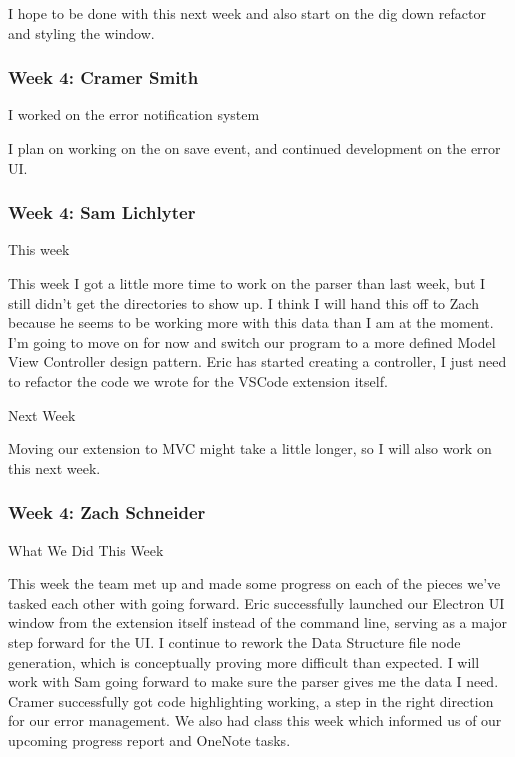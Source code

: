 I hope to be done with this next week and also start on the dig down refactor and styling the window. \\ 

 \subsubsection{Week 4: Cramer Smith}

I worked on the error notification system



I plan on working on the on save event, and continued development on the error UI. \\ 

 \subsubsection{Week 4: Sam Lichlyter}

This week

This week I got a little more time to work on the parser than last week, but I still didn't get the directories to show up. I think I will hand this off to Zach because he seems to be working more with this data than I am at the moment. I'm going to move on for now and switch our program to a more defined Model View Controller design pattern. Eric has started creating a controller, I just need to refactor the code we wrote for the VSCode extension itself. 



Next Week

Moving our extension to MVC might take a little longer, so I will also work on this next week.  \\ 

 \subsubsection{Week 4: Zach Schneider}

What We Did This Week

This week the team met up and made some progress on each of the pieces we've tasked each other with going forward. Eric successfully launched our Electron UI window from the extension itself instead of the command line, serving as a major step forward for the UI. I continue to rework the Data Structure file node generation, which is conceptually proving more difficult than expected. I will work with Sam going forward to make sure the parser gives me the data I need. Cramer successfully got code highlighting working, a step in the right direction for our error management. We also had class this week which informed us of our upcoming progress report and OneNote tasks.



